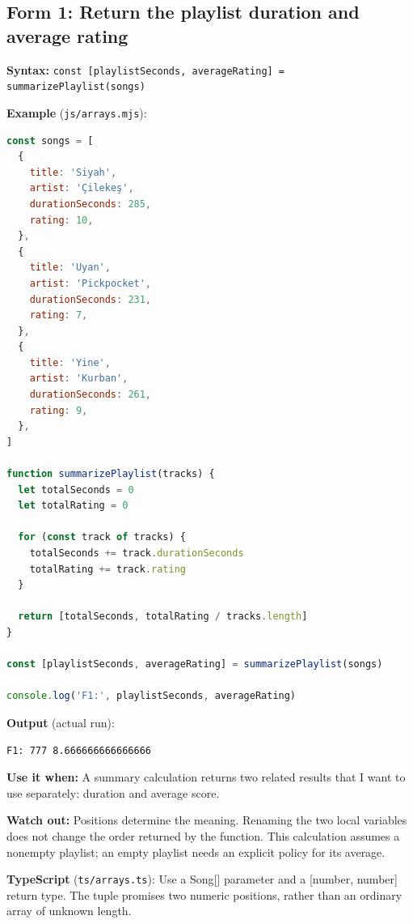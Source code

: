 \documentclass[
  10pt,
  a4paper,
  titlepage]{article}
\newcommand{\passthrough}[1]{#1}
\newcounter{none} %
\begin{document}
\subsection{Form 1: Return the playlist duration and average
rating}\label{form-1-return-the-playlist-duration-and-average-rating}

\textbf{Syntax:}
\passthrough{\lstinline!const [playlistSeconds, averageRating] = summarizePlaylist(songs)!}


\textbf{Example} (\passthrough{\lstinline!js/arrays.mjs!}):

\Needspace{82.4pt}
\begin{lstlisting}[language=JavaScript]
const songs = [
  {
    title: 'Siyah',
    artist: 'Çilekeş',
    durationSeconds: 285,
    rating: 10,
  },
  {
    title: 'Uyan',
    artist: 'Pickpocket',
    durationSeconds: 231,
    rating: 7,
  },
  {
    title: 'Yine',
    artist: 'Kurban',
    durationSeconds: 261,
    rating: 9,
  },
]

function summarizePlaylist(tracks) {
  let totalSeconds = 0
  let totalRating = 0

  for (const track of tracks) {
    totalSeconds += track.durationSeconds
    totalRating += track.rating
  }

  return [totalSeconds, totalRating / tracks.length]
}

const [playlistSeconds, averageRating] = summarizePlaylist(songs)

console.log('F1:', playlistSeconds, averageRating)
\end{lstlisting}


\textbf{Output} (actual run):

\Needspace{30.9pt}
\begin{lstlisting}
F1: 777 8.666666666666666
\end{lstlisting}

\textbf{Use it when:} A summary calculation returns two related results
that I want to use separately: duration and average score.

\textbf{Watch out:} Positions determine the meaning. Renaming the two
local variables does not change the order returned by the function. This
calculation assumes a nonempty playlist; an empty playlist needs an
explicit policy for its average.

\textbf{TypeScript} (\passthrough{\lstinline!ts/arrays.ts!}): Use a
Song{[}{]} parameter and a {[}number, number{]} return type. The tuple
promises two numeric positions, rather than an ordinary array of unknown
length.
\end{document}
